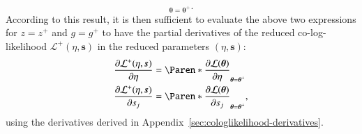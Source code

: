 \documentclass{aa}
\newcommand*{\PDer}[2]{\frac{\partial#1}{\partial#2}}
\newcommand*{\V}[1]{\boldsymbol{#1}}   %
\newcommand*{\MC}[1]{\mathcal{#1}}
\newcommand*{\lkl}{\MC{L}}
\newcommand*{\lklplus}{\MC{L}^+}
\begin{document}
\begin{appendix}
\begin{equation}
{  }_{\V\theta=\V\theta^+}.
  \label{eq:derive-reduced-cologlikelihood-in-alpha}
\end{equation}
According to this result, it is then sufficient to evaluate the above two
expressions for $z=z^+$ and $g=g^+$ to have the partial derivatives of the
reduced co-log-likelihood $\lklplus(\eta, \V s)$ in the reduced parameters
$(\eta, \V s)$:
\begin{align}
  \PDer{\lklplus(\eta, \V s)}{\eta}
  &= \Paren*{\PDer{\lkl(\V\theta)}{\eta}}_{\V\theta=\V\theta^+}\\
  \PDer{\lklplus(\eta, \V s)}{s_j}
  &= \Paren*{\PDer{\lkl(\V\theta)}{s_j}}_{\V\theta=\V\theta^+},
\end{align}
using the derivatives derived in Appendix~\ref{sec:cologlikelihood-derivatives}.


\end{appendix}
\end{document}
